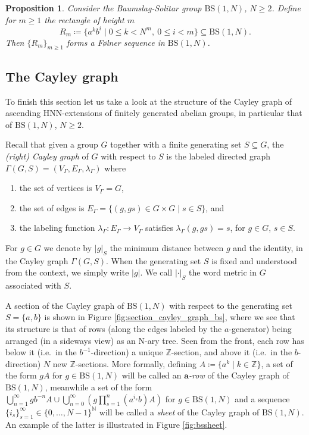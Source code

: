 \documentclass[cupthm,crop,info]{CUP-JNL-ETS}%
\theoremstyle{cupplain}
\newtheorem{proposition}[theorem]{Proposition}
\theoremstyle{cupdefinition}
\theoremstyle{cupremark}
\theoremstyle{cupproof}
\numberwithin{equation}{section}
\newcommand{\BS}[1][N]{\mathrm{BS}(1,#1)}
\begin{document}
\begin{proposition}\label{prop:rectangles_and_folner} Consider the Baumslag-Solitar group $\BS$, $N\ge 2$. Define for $m\ge 1$ the \textit{rectangle of height $m$}
	$$
	R_m\coloneqq \{a^kb^i\mid 0\le k<N^m, \ 0\le i<m  \}\subseteq \BS.
	$$
	Then $\{R_m\}_{m\ge 1}$ forms a F\o lner sequence in $\BS$.
\end{proposition}




\subsection{The Cayley graph }\label{subsection:Cayley}

To finish this section let us take a look at the structure of the Cayley graph of ascending HNN-extensions of finitely generated abelian groups, in particular that of $\BS$, $N\ge 2$. 

Recall that given a group $G$ together with a finite generating set $S\subseteq G$, the \textit{(right) Cayley graph} of $G$ with respect to $S$ is the labeled directed graph  $\Gamma(G,S)=(V_{\Gamma},E_{\Gamma},\lambda_{\Gamma})$ where
\begin{enumerate}
	\item the set of vertices is $V_\Gamma=G$, 
	\item the set of edges is $E_{\Gamma}=\{(g,gs)\in G\times G\mid s\in S\}$, and
	\item the labeling function $\lambda_{\Gamma}:E_{\Gamma}\to V_{\Gamma}$ satisfies $\lambda_{\Gamma}(g,gs)=s$, for $g\in G$, $s\in S$.
\end{enumerate}
For $g\in G$ we denote by $|g|_S$ the minimum distance between $g$ and the identity, in the Cayley graph $\Gamma(G,S)$. When the generating set $S$ is fixed and understood from the context, we simply write $|g|$. We call $|\cdot|_S$ the word metric in $G$ associated with $S$.

A section of the Cayley graph of $\BS$ with respect to the generating set $S=\{a,b\}$ is shown in Figure \ref{fig:section_cayley_graph_bs}, where we see that its structure is that of rows (along the edges labeled by the $a$-generator) being arranged (in a sideways view) as an N-ary tree. Seen from the front, each row has below it (i.e.\ in the $b^{-1}$-direction) a unique $\mathbb{Z}$-section, and above it (i.e.\ in the $b$-direction) $N$ new $\mathbb{Z}$-sections. More formally, defining $A\coloneqq\{a^k \mid k\in\mathbb{Z}\}$, a set of the form $gA$ for $g\in \BS$ will be called an $\mathbf{a}$\textit{-row} of the Cayley graph of $\BS$, meanwhile a set of the form $\displaystyle\bigcup_{n=1}^{\infty}gb^{-n}A  \cup\bigcup_{n=0}^\infty\left( g\prod_{s=1}^{n}(a^{i_s}b)A \right)$ for $g\in \BS$ and a sequence $\{i_s\}_{s=1}^{\infty}\in \{0,\ldots,N-1\}^{\mathbb{N}}$ will be called a \textit{sheet} of the Cayley graph of $\BS$. An example of the latter is illustrated in Figure \ref{fig:bssheet}. 
\end{document}
